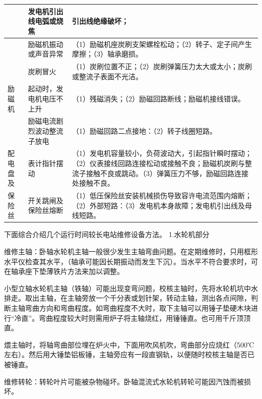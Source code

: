 \documentclass{ctexbook}
\begin{document}
\begin{table}[htbp]
\begin{tabular}{l|l|p{80em}}
		&发电机引出线电弧或烧焦&引出线绝缘破坏；\\ \hline
		&励磁机振动或声音异常&（1）励磁机座炭刷支架螺栓松动；\newline{}（2）转子、定子间产生摩擦；\newline{}（3）轴承磨损。\\ \hline
		&炭刷冒火&（1）炭刷位置不正；\newline{}（2）炭刷弹簧压力太大或太小；炭刷或整流子表面不光洁。\\ \hline
		励磁机&起动时，发电机电压不上升&（1）残磁消失；\newline{}（2）励磁回路断线；励磁机接线错误。\\ \hline
		&励磁电流剧烈波动整流子放电&（1）励磁回路二点接地：\newline{}（2）转子线圈短路。\\ \hline
		配电盘及&表计指针摆动&（1）发电机容量较小，负荷波动大，引起指针瞬时摆动；\newline{}（2）仪表接线回路连接松动或接触不良；励磁机炭刷与整流子接触不良或跳动。\newline{}（3）弹簧压力不够，励磁回路连接处接触不良。\\ \hline
		保险丝&开关跳闸及保险丝熔断&（1）低压保险丝安装机械损伤导致容许电流范围内熔断；\newline{}（2）外部短路：\newline{}（3）发电机本身故障；发电机引出线及母线短路。\\
		\hline
	\end{tabular}%
	\label{tab:shigu}%
\end{table}%

下面综合介绍几个运行时间较长电站维修设备方法。
1.水轮机部分

维修主轴：卧轴水轮机主轴一般很少发生主轴弯曲问题。在定期维修时，只用框形水平仪检查其水平，（轴承可能因长期振动而发生下沉）。当水平不符合要求时，可在轴承座下垫薄铁片方法来加以调整。

小型立轴水轮机主轴（铁轴）可能出现变弯问题，校核主轴时，先将水轮机坑中水排走。取出主轴，在主轴旁放一个千分表或划针架，转动主轴，测出各点间隙，判断主轴弯曲方向和弯曲程度。如弯曲程度不大时，取下主轴可以用锤子垫硬木块进行“冷直”。弯曲程度较大时则需用炉子将主轴烧红，用锤锤直。也可用千斤顶顶直。

煨主轴时，将轴弯曲部位埋在炉火中，下面用吹风机吹，弯曲部分应烧红（500℃左右）。然后用大锤垫铝板锤，主轴旁应有一段直钢轨，以便随时校核主轴是否已被锤直。

维修转轮：转轮叶片可能被杂物碰坏。卧轴混流式水轮机转轮可能因汽蚀而被损坏。
\end{document}
